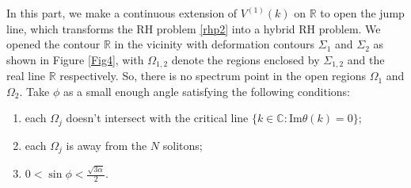 \documentclass[11pt]{article}
\numberwithin{equation}{section}
\begin{document}
In this part, we make a continuous extension of $V^{(1)}(k)$ on $\mathbb{R}$ to open the jump line, which transforms the RH problem \ref{rhp2} into a hybrid RH problem. We opened the contour $\mathbb{R}$  in the vicinity with  deformation contours  $\Sigma_1 $  and   $\Sigma_2$ as shown in Figure \ref{Fig4}, with   $\Omega_{1,2}$ denote the regions enclosed by $\Sigma_{1,2}$ and the real line $\mathbb{R}$ respectively.
So, there is no spectrum point in the open regions $\Omega_1 $ and $\Omega_2$. Take $\phi$ as a small enough angle satisfying the following conditions:
\begin{enumerate}
    \item each $\Omega_j$ doesn't intersect with the  critical line $\{k\in\mathbb{C}:\mathrm{Im}\theta(k)=0\}$;\label{phi-1}
    \item each $\Omega_j$ is away from the $N$ solitons;
    \item $0<\sin\phi<\frac{\sqrt{3\alpha}}{2}$.\label{phi-3}
\end{enumerate}
\end{document}
